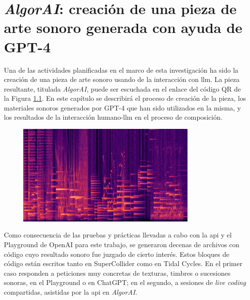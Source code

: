 \chapter{\emph{AlgorAI}: creación de una pieza de arte sonoro generada con ayuda de GPT-4}
\label{chap:algorai}



Una de las actividades planificadas en el marco de esta investigación ha sido la creación de una pieza de arte sonoro usando de la interacción con \gls{llm}. La pieza resultante, titulada \emph{AlgorAI}, puede ser escuchada en el enlace del código QR de la Figura \ref{fig:sonograma_algorai}. En este capítulo se describirá el proceso de creación de la pieza, los materiales sonoros generados por GPT-4 que han sido utilizados en la misma, y los resultados de la interacción humano-\gls{llm} en el proceso de composición.

\begin{figure}[H]
    \centering
    \includegraphics[width=0.8\textwidth]{./figuras/sonograma_02.png}
    \source{\propio}
    \label{fig:sonograma_algorai}
\end{figure}

Como consecuencia de las pruebas y prácticas llevadas a cabo con la \gls{api} y el Playground de OpenAI para este trabajo, se generaron decenas de archivos con código cuyo resultado sonoro fue juzgado de cierto interés. Estos bloques de código están escritos tanto en SuperCollider como en Tidal Cycles. En el primer caso responden a peticiones muy concretas de texturas, timbres o sucesiones sonoras, en el Playground o en ChatGPT; en el segundo, a sesiones de \emph{live coding} compartidas, asistidas por la \gls{api} en \emph{AlgorAI}.

